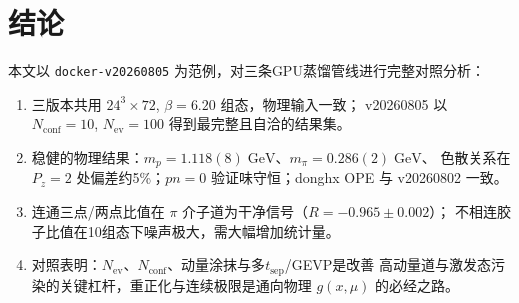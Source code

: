 \documentclass[11pt,a4paper]{article}
\newcommand{\gev}{\;\mathrm{GeV}}
\newcommand{\Nconf}{N_{\mathrm{conf}}}
\newcommand{\Nev}{N_{\mathrm{ev}}}
\newcommand{\tsep}{t_{\mathrm{sep}}}
\begin{document}
\section{结论}
本文以 \texttt{docker-v20260805} 为范例，对三条GPU蒸馏管线进行完整对照分析：
\begin{enumerate}[leftmargin=*]
\item 三版本共用 $24^3\times72$, $\beta=6.20$ 组态，物理输入一致；
      v20260805 以 $\Nconf=10$, $\Nev=100$ 得到最完整且自洽的结果集。
\item 稳健的物理结果：$m_p=1.118(8)\gev$、$m_\pi=0.286(2)\gev$、
      色散关系在 $P_z=2$ 处偏差约5\%；$pn=0$ 验证味守恒；donghx OPE 与 v20260802 一致。
\item 连通三点/两点比值在 $\pi$ 介子道为干净信号（$R=-0.965\pm0.002$）；
      不相连胶子比值在10组态下噪声极大，需大幅增加统计量。
\item 对照表明：$\Nev$、$\Nconf$、动量涂抹与多$\tsep$/GEVP是改善
      高动量道与激发态污染的关键杠杆，重正化与连续极限是通向物理 $g(x,\mu)$ 的必经之路。
\end{enumerate}
\end{document}
